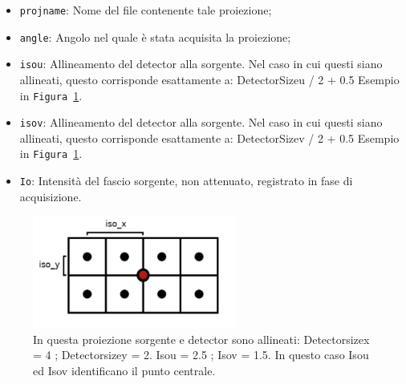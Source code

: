 \documentclass[a4paper,12pt, doubleside]{report}
\begin{document}
                    \begin{itemize}
                        \item \texttt{proj\textunderscore name}: Nome del file contenente tale proiezione;
                        \item \texttt{angle}: Angolo nel quale è stata acquisita la proiezione;
                        \item \texttt{iso\textunderscore u}:  Allineamento del detector alla sorgente. Nel caso in cui questi siano allineati, questo corrisponde esattamente a:
                        \newline
                        Detector\textunderscore Size\textunderscore u / 2 + 0.5
                        \newline
                        Esempio in \texttt{Figura \ref{fig:iso}}.
                        \item \texttt{iso\textunderscore v}: Allineamento del detector alla sorgente. Nel caso in cui questi siano allineati, questo corrisponde esattamente a:
                        \newline
                        Detector\textunderscore Size\textunderscore v / 2 + 0.5
                        \newline
                        Esempio in \texttt{Figura \ref{fig:iso}}.
                        \item \texttt{Io}: Intensità del fascio sorgente, non attenuato, registrato in fase di acquisizione. 
                    \end{itemize}
                    
                    \begin{figure}[h]
                        \centering
                        \includegraphics[width=0.6\textwidth]{iso}
                        \caption{In questa proiezione sorgente e detector sono allineati: Detector\textunderscore size\textunderscore x = 4 ; Detector\textunderscore size\textunderscore y = 2. Iso\textunderscore u = 2.5 ; Iso\textunderscore v = 1.5. In questo caso Iso\textunderscore u ed Iso\textunderscore v identificano il punto centrale. }
                        \label{fig:iso}
                    \end{figure}
                    
\end{document}
